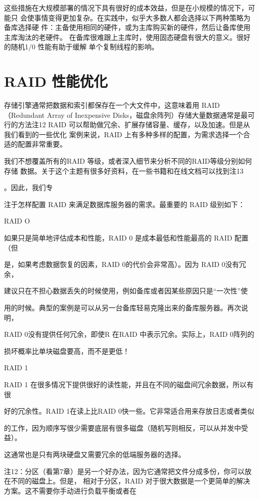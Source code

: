 这些措施在大规模部署的情况下具有很好的成本效益，但是在小规模的情况下，可能只
会使事情变得更加复杂。在实践中，似乎大多数人都会选择以下两种策略为备库选择硬
件：主备使用相同的硬件，或为主库购买新的硬件，然后让备库使用主库淘汰的老硬件。
在备库很难跟上主库时，使用固态硬盘有很大的意义。很好的随机1/0 性能有助于缓解
单个复制线程的影响。

\section{RAID 性能优化}
存储引擎通常把数据和索引都保存在一个大文件中，这意味着用 RAID （Redundant
Array of Inexpensive Disks，磁盘余阵列）存储大量数据通常是最可行的方法注12
RAID 可以帮助做冗余、扩展存储容量、缓存，以及加速。但是从我们看到的一些优化
案例来说，RAID 上有多种多样的配置，为需求选择一个合适的配置非常重要。

我们不想覆盖所有的RAID 等级，或者深入细节来分析不同的RAID等级分别如何存储
数据。关于这个主题有很多好资料，在一些书籍和在线文档可以找到注13

。因此，我们专

注于怎样配置 RAID 来满足数据库服务器的需求。最重要的 RAID 级别如下：

RAID O

如果只是简单地评估成本和性能，RAID 0 是成本最低和性能最高的 RAID 配置（但

是，如果考虑数据恢复的因素，RAID 0的代价会非常高）。因为 RAID 0没有冗余，

建议只在不担心数据丢失的时候使用，例如备库或者因某些原因只是“一次性”使

用的时候。典型的案例是可以从另一台备库轻易克隆出来的备库服务器。再次说明，

RAID 0没有提供任何冗余，即使R 在RAID 中表示冗余。实际上，RAID 0阵列的

损坏概率比单块磁盘要高，而不是更低！

RAID 1

RAID 1 在很多情况下提供很好的读性能，并且在不同的磁盘间冗余数据，所以有很

好的冗余性。RAID 1在读上比RAID 0快一些。它非常适合用来存放日志或者类似

的工作，因为顺序写很少需要底层有很多磁盘（随机写则相反，可以从并发中受益）。

这通常也是只有两块硬盘又需要冗余的低端服务器的选择。

注12：分区（看第7章）是另一个好办法，因为它通常把文件分成多份，你可以放在不同的磁盘上。但是，
相对于分区，RAID 对于很大数据是一个更简单的解决方案。这不需要你手动进行负载平衡或者在

